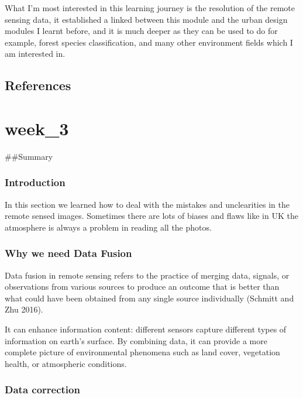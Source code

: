 \documentclass[
  letterpaper,
  DIV=11,
  numbers=noendperiod]{scrreprt}
\begin{document}
What I'm most interested in this learning journey is the resolution of
the remote sensing data, it established a linked between this module and
the urban design modules I learnt before, and it is much deeper as they
can be used to do for example, forest species classification, and many
other environment fields which I am interested in.

\section{\texorpdfstring{\textbf{References}}{References}}\label{references}


\chapter{week\_3}\label{week_3}

\#\#Summary

\subsection{Introduction}\label{introduction-1}

In this section we learned how to deal with the mistakes and
unclearities in the remote sensed images. Sometimes there are lots of
biases and flaws like in UK the atmosphere is always a problem in
reading all the photos.

\subsection{Why we need Data Fusion}\label{why-we-need-data-fusion}

Data fusion in remote sensing refers to the practice of merging data,
signals, or observations from various sources to produce an outcome that
is better than what could have been obtained from any single source
individually (Schmitt and Zhu 2016).

It can enhance information content: different sensors capture different
types of information on earth's surface. By combining data, it can
provide a more complete picture of environmental phenomena such as land
cover, vegetation health, or atmospheric conditions.

\subsection{Data correction}\label{data-correction}
\end{document}
